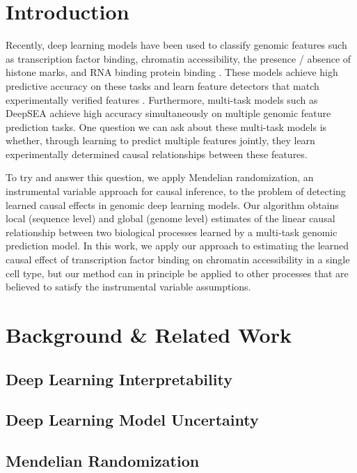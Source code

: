 \documentclass{article}
\begin{document}
\section{Introduction}
\label{introduction}
Recently, deep learning models have been used to classify genomic features such as transcription factor binding, chromatin accessibility, the presence / absence of histone marks, and RNA binding protein binding . These models achieve high predictive accuracy on these tasks and learn feature detectors that match experimentally verified features . Furthermore, multi-task models such as DeepSEA  achieve high accuracy simultaneously on multiple genomic feature prediction tasks. One question we can ask about these multi-task models is whether, through learning to predict multiple features jointly, they learn experimentally determined causal relationships between these features.


To try and answer this question, we apply Mendelian randomization, an instrumental variable  approach for causal inference, to the problem of detecting learned causal effects in genomic deep learning models. Our algorithm obtains local (sequence level) and global (genome level) estimates of the linear causal relationship between two biological processes learned by a multi-task genomic prediction model. In this work, we apply our approach to estimating the learned causal effect of transcription factor binding on chromatin accessibility in a single cell type, but our method can in principle be applied to other processes that are believed to satisfy the instrumental variable assumptions.

\section{Background \& Related Work}
\subsection{Deep Learning Interpretability}

\subsection{Deep Learning Model Uncertainty}

\subsection{Mendelian Randomization}
\end{document}
